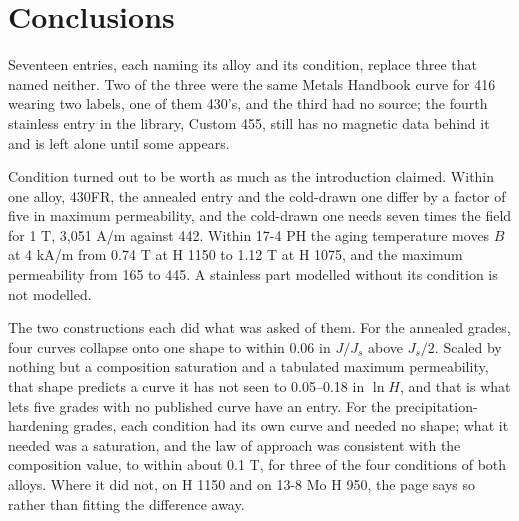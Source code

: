 \documentclass[
  11pt,
]{article}
\begin{document}
\section{Conclusions}\label{conclusions}

Seventeen entries, each naming its alloy and its condition, replace three that named neither. Two of the three were the same Metals Handbook curve for 416 wearing two labels, one of them 430's, and the third had no source; the fourth stainless entry in the library, Custom 455, still has no magnetic data behind it and is left alone until some appears.

Condition turned out to be worth as much as the introduction claimed. Within one alloy, 430FR, the annealed entry and the cold-drawn one differ by a factor of five in maximum permeability, and the cold-drawn one needs seven times the field for 1 T, 3,051 A/m against 442. Within 17-4 PH the aging temperature moves \(B\) at 4 kA/m from 0.74 T at H 1150 to 1.12 T at H 1075, and the maximum permeability from 165 to 445. A stainless part modelled without its condition is not modelled.

The two constructions each did what was asked of them. For the annealed grades, four curves collapse onto one shape to within 0.06 in \(J/J_s\) above \(J_s/2\). Scaled by nothing but a composition saturation and a tabulated maximum permeability, that shape predicts a curve it has not seen to 0.05--0.18 in \(\ln H\), and that is what lets five grades with no published curve have an entry. For the precipitation-hardening grades, each condition had its own curve and needed no shape; what it needed was a saturation, and the law of approach was consistent with the composition value, to within about 0.1 T, for three of the four conditions of both alloys. Where it did not, on H 1150 and on 13-8 Mo H 950, the page says so rather than fitting the difference away.
\end{document}
